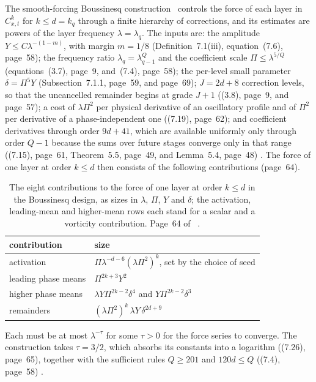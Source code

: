 \documentclass[11pt]{article}
\theoremstyle{remark}
\newcommand{\ev}[1]{\hspace{0.2em}{\small\textsf{[#1]}}}
\begin{document}
The smooth-forcing Boussinesq construction~\cite{ab-boussinesq} controls the force of each layer in
$C^{k}_{x,t}$ for $k\le d=k_{q}$ through a finite hierarchy of corrections, and its estimates are
powers of the layer frequency $\lambda=\lambda_{q}$. The inputs are: the amplitude $Y\le C\lambda^{-(1-m)}$, with margin $m=1/8$
(Definition~7.1(iii), equation~(7.6), page~58); the frequency ratio
$\lambda_{q}=\lambda_{q-1}^{Q}$ and the coefficient scale $\Pi\le\lambda^{5/Q}$ (equations~(3.7), page~9,
and~(7.4), page~58); the per-level small parameter $\delta=\Pi^{5}Y$ (Subsection~7.1.1, page~59, and
page~69); $J=2d+8$ correction levels, so that the uncancelled remainder begins at grade $J+1$
((3.8), page~9, and page~57); a cost of $\lambda\Pi^{2}$ per physical derivative of an oscillatory
profile and of $\Pi^{2}$ per derivative of a phase-independent one ((7.19), page~62); and coefficient
derivatives through order $9d+41$, which are available uniformly only through order $Q-1$ because the
sums over future stages converge only in that range ((7.15), page~61, Theorem~5.5, page~49, and
Lemma~5.4, page~48) \ev{V}. The force of one layer at order $k\le d$ then consists of the following
contributions (page~64).
\begin{table}[t]
\centering
\begin{tabular}{ll}
\toprule
contribution & size \\
\midrule
activation & $\Pi\lambda^{-d-6}(\lambda\Pi^{2})^{k}$, set by the choice of seed \\
leading phase means & $\Pi^{2k+3}Y^{2}$ \\
higher phase means & $\lambda Y\Pi^{2k-2}\delta^{4}$ and $Y\Pi^{2k-2}\delta^{3}$ \\
remainders & $(\lambda\Pi^{2})^{k}\,\lambda Y\,\delta^{2d+9}$ \\
\bottomrule
\end{tabular}
\caption{The eight contributions to the force of one layer at order $k\le d$ in the
Boussinesq design, as sizes in $\lambda$, $\Pi$, $Y$ and $\delta$; the activation, leading-mean and
higher-mean rows each stand for a scalar and a vorticity contribution. Page~64 of~\cite{ab-boussinesq}
\ev{V}.}\label{tab:contrib}
\end{table}
Each must be at most $\lambda^{-\tau}$ for some $\tau>0$ for the force series to converge. The
construction takes $\tau=3/2$, which absorbs its constants into a logarithm ((7.26), page~65),
together with the sufficient rules $Q\ge201$ and $120d\le Q$ ((7.4), page~58) \ev{V}.
\end{document}
